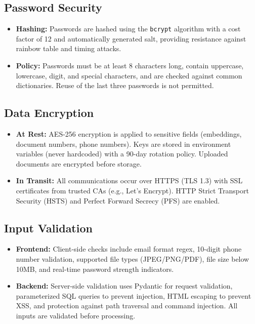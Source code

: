 \documentclass[12pt,a4paper]{article}
\begin{document}
\subsection{Password Security}

\begin{itemize}
    \item \textbf{Hashing:} Passwords are hashed using the \texttt{bcrypt} algorithm with a cost factor of 12 and automatically generated salt, providing resistance against rainbow table and timing attacks.
    \item \textbf{Policy:} Passwords must be at least 8 characters long, contain uppercase, lowercase, digit, and special characters, and are checked against common dictionaries. Reuse of the last three passwords is not permitted.
\end{itemize}

\subsection{Data Encryption}

\begin{itemize}
    \item \textbf{At Rest:} AES-256 encryption is applied to sensitive fields (embeddings, document numbers, phone numbers). Keys are stored in environment variables (never hardcoded) with a 90-day rotation policy. Uploaded documents are encrypted before storage.
    \item \textbf{In Transit:} All communications occur over HTTPS (TLS 1.3) with SSL certificates from trusted CAs (e.g., Let’s Encrypt). HTTP Strict Transport Security (HSTS) and Perfect Forward Secrecy (PFS) are enabled.
\end{itemize}

\subsection{Input Validation}

\begin{itemize}
    \item \textbf{Frontend:} Client-side checks include email format regex, 10-digit phone number validation, supported file types (JPEG/PNG/PDF), file size below 10MB, and real-time password strength indicators.
    \item \textbf{Backend:} Server-side validation uses Pydantic for request validation, parameterized SQL queries to prevent injection, HTML escaping to prevent XSS, and protection against path traversal and command injection. All inputs are validated before processing.
\end{itemize}
\end{document}
